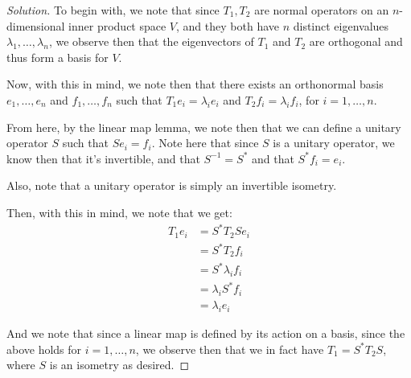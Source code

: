 \documentclass{article}
\newenvironment{solution}{\begin{proof}[Solution]}{\end{proof}}
\begin{document}
\begin{solution}
\begin{comment}
	From here, we observe that if we let $S = S_{2}S_{1}^{*}$, we see then that $S^{*} = (S_{2}S_{1}^{*})^{*} = S_{1}S_{2}^{*}$. Furthermore, we have $S^{*}S = (S_{1}S_{2}^{*})(S_{2}S_{1}^{*}) = I$. Thus, we see that, indeed, we have that $S$ is an isometry, and that
	\begin{equation*}
		T_{1} = S^{*}DS.
	\end{equation*}
	\end{comment}

	To begin with, we note that since $T_{1}, T_{2}$ are normal operators on an $n$-dimensional inner product space $V$, and they both have $n$ distinct eigenvalues $\lambda_1, \ldots, \lambda_n$, we observe then that the eigenvectors of $T_{1}$ and $T_{2}$ are orthogonal and thus form a basis for $V$.
	
	Now, with this in mind, we note then that there exists an orthonormal basis $e_{1}, \ldots, e_{n}$ and $f_{1}, \ldots, f_{n}$ such that $T_{1}e_{i} = \lambda_ie_i$ and $T_{2}f_{i} = \lambda_if_i$, for $i = 1, \ldots, n$.
	
	From here, by the linear map lemma, we note then that we can define a unitary operator $S$ such that $Se_{i} = f_{i}$. Note here that since $S$ is a unitary operator, we know then that it's invertible, and that $S^{-1} = S^{*}$ and that $S^{*}f_{i} = e_{i}$.
	
	Also, note that a unitary operator is simply an invertible isometry.
	
	Then, with this in mind, we note that we get:
	\begin{align*}
		T_{1}e_{i} &= S^{*}T_{2}Se_{i} \\
		&= S^{*}T_{2}f_{i} \\
		&= S^{*}\lambda_if_i \\
		&= \lambda_i S^{*}f_{i} \\
		&= \lambda_i e_{i}
	\end{align*}

	And we note that since a linear map is defined by its action on a basis, since the above holds for $i = 1, \ldots, n$, we observe then that we in fact have $T_{1} = S^{*}T_{2}S$, where $S$ is an isometry as desired.
\end{solution}

\newpage
\end{document}
